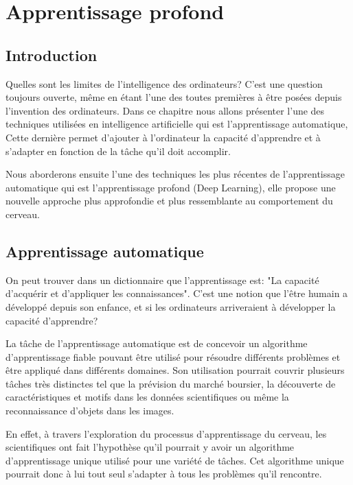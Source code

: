 
\chapter{Apprentissage profond}

\section{Introduction}

	Quelles sont les limites de l'intelligence des ordinateurs? C'est une question toujours ouverte, même en étant l'une des toutes premières à être posées depuis l'invention des ordinateurs. Dans ce chapitre nous allons présenter l'une des techniques utilisées en intelligence artificielle qui est l'apprentissage automatique, Cette dernière permet d'ajouter à l'ordinateur la capacité d'apprendre et à s'adapter en fonction de la tâche qu'il doit accomplir.
	
	Nous aborderons ensuite l'une des techniques les plus récentes de l'apprentissage automatique qui est l'apprentissage profond (Deep Learning), elle propose une nouvelle approche plus approfondie et plus ressemblante au comportement du cerveau.


\section{Apprentissage automatique}

	On peut trouver dans un dictionnaire que l'apprentissage est: "La capacité d'acquérir et d'appliquer les connaissances". C'est une notion que l'être humain a développé depuis son enfance, et si les ordinateurs arriveraient à développer la capacité d'apprendre?

	La tâche de l'apprentissage automatique est de concevoir un algorithme d'apprentissage fiable pouvant être utilisé pour résoudre différents problèmes et être appliqué dans différents domaines. Son utilisation pourrait couvrir plusieurs tâches très distinctes tel que la prévision du marché boursier, la découverte de caractéristiques et motifs dans les données scientifiques ou même la reconnaissance d'objets dans les images.

	En effet, à travers l'exploration du processus d'apprentissage du cerveau, les scientifiques ont fait l'hypothèse qu'il pourrait y avoir un algorithme d'apprentissage unique utilisé pour une variété de tâches. Cet algorithme unique pourrait donc à lui tout seul s'adapter à tous les problèmes qu'il rencontre. 

